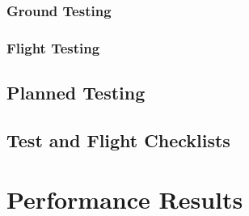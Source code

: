 \documentclass[report]{byu-aero}
\begin{document}
\subsubsection{Ground Testing}
\label{sssec:groundtesting}



\subsubsection{Flight Testing}
\label{sssec:flighttesting}



\subsection{Planned Testing}
\label{ssec:plannedtesting}



\subsection{Test and Flight Checklists}



\section{Performance Results} %
\label{sec:PerformanceResults}






{}

\end{document}
